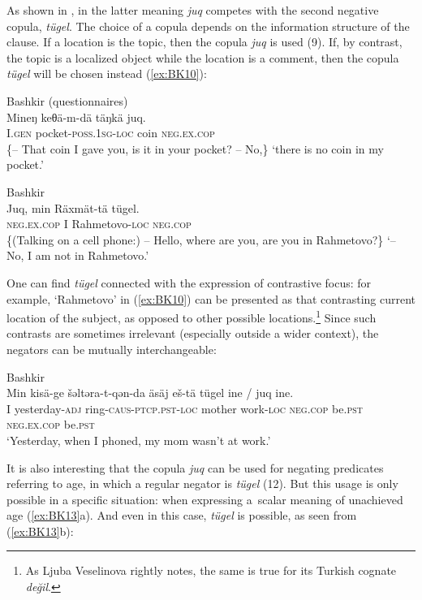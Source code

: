 \documentclass[output=paper]{langsci/langscibook}
\begin{document}
As shown in \citet{mishchenko2017a}, in the latter meaning \textit{juq} competes with the second negative copula, \textit{tügel}. The choice of a copula depends on the information structure of the clause. If a location is the topic, then the copula \textit{juq} is used (9). If, by contrast, the topic is a localized object while the location is a comment, then the copula \textit{tügel} will be chosen instead (\ref{ex:BK10}):

\ea Bashkir (questionnaires) \label{ex:BK9}\\
	\gll Mineŋ		keθä-m-dä				täŋkä		juq.\\
	I.\textsc{gen}		pocket-\textsc{poss.1sg-loc}	coin		\textsc{neg.ex.cop}\\
	\glt \{– That coin I gave you, is it in your pocket? – No,\} `there is no coin in my pocket.'
\z

\ea Bashkir \citep[138]{mishchenko2017a} \label{ex:BK10}\\
	\gll Juq,			min	Räxmät-tä			tügel.\\
	\textsc{neg.ex.cop}	I		Rahmetovo-\textsc{loc}	\textsc{neg.cop}\\
	\glt \{(Talking on a cell phone:) – Hello, where are you, are you in Rahmetovo?\} `– No, I am not in Rahmetovo.'
\z


One can find \textit{tügel} connected with the expression of contrastive focus: for example, ‘Rahmetovo’ in (\ref{ex:BK10}) can be presented as that contrasting current location of the subject, as opposed to other possible locations.\footnote{As Ljuba Veselinova rightly notes, the same is true for its Turkish cognate \textit{değil}.} Since such contrasts are sometimes irrelevant (especially outside a wider context), the negators can be mutually interchangeable:

\ea Bashkir \citep[138]{mishchenko2017a} \label{ex:BK11}\\
	\gll Min	kisä-ge			šəltəra-t-qən-da			äsäj    eš-tä			tügel			ine		{/ juq}				ine.\\
	I		yesterday-\textsc{adj}	ring-\textsc{caus-ptcp.pst-loc}	mother  work-\textsc{loc}	\textsc{neg.cop}		be.\textsc{pst}	\textsc{neg.ex.cop}		be.\textsc{pst}\\
	\glt `Yesterday, when I phoned, my mom wasn’t at work.'
\z

It is also interesting that the copula \textit{juq} can be used for negating predicates referring to age, in which a regular negator is \textit{tügel} (12). But this usage is only possible in a specific situation: when expressing a scalar meaning of unachieved age (\ref{ex:BK13}a). And even in this case, \textit{tügel} is possible, as seen from (\ref{ex:BK13}b):
\end{document}
